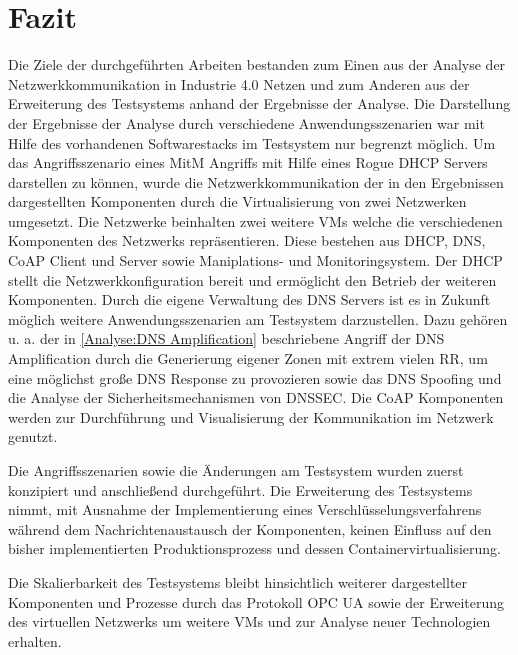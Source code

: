 \chapter{Fazit}
\label{Fazit}
Die Ziele der durchgeführten Arbeiten bestanden zum Einen aus der Analyse der Netzwerkkommunikation in Industrie 4.0 Netzen und zum Anderen aus der Erweiterung des Testsystems anhand der Ergebnisse der Analyse. Die Darstellung der Ergebnisse der Analyse durch verschiedene Anwendungsszenarien war mit Hilfe des vorhandenen Softwarestacks im Testsystem nur  begrenzt möglich. Um das Angriffsszenario eines \ac{MitM} Angriffs mit Hilfe eines Rogue \ac{DHCP} Servers darstellen zu können, wurde die Netzwerkkommunikation der in den Ergebnissen dargestellten Komponenten durch die Virtualisierung von zwei Netzwerken umgesetzt. Die Netzwerke beinhalten zwei weitere \ac{VM}s welche die verschiedenen Komponenten des Netzwerks repräsentieren. Diese bestehen aus \ac{DHCP}, \ac{DNS}, \ac{CoAP} Client und Server sowie Maniplations- und Monitoringsystem. Der \ac{DHCP} stellt die Netzwerkkonfiguration bereit und ermöglicht den Betrieb der weiteren Komponenten. Durch die eigene Verwaltung des \ac{DNS} Servers ist es in Zukunft möglich weitere Anwendungsszenarien am Testsystem darzustellen. Dazu gehören u. a. der in \autoref{Analyse:DNS Amplification} beschriebene Angriff der \ac{DNS} Amplification durch die Generierung eigener Zonen mit extrem vielen \ac{RR}, um eine möglichst große \ac{DNS} Response zu provozieren sowie das \ac{DNS} Spoofing und die Analyse der Sicherheitsmechanismen von \ac{DNSSEC}. Die \ac{CoAP} Komponenten werden zur Durchführung und Visualisierung der Kommunikation im Netzwerk genutzt.

Die Angriffsszenarien sowie die Änderungen am Testsystem wurden zuerst konzipiert und anschließend durchgeführt. Die Erweiterung des Testsystems nimmt, mit Ausnahme der Implementierung eines Verschlüsselungsverfahrens während dem Nachrichtenaustausch der Komponenten, keinen Einfluss auf den bisher implementierten Produktionsprozess und dessen Containervirtualisierung. 

Die Skalierbarkeit des Testsystems bleibt hinsichtlich weiterer dargestellter Komponenten und Prozesse durch das Protokoll \ac{OPC UA} sowie der Erweiterung des virtuellen Netzwerks um weitere \ac{VM}s und zur Analyse neuer Technologien erhalten. 

